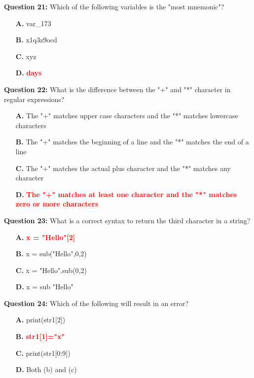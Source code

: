 \documentclass[12pt,a4paper]{article}
\begin{document}
\vspace{0.5cm}

\textbf{Question 21:} Which of the following variables is the "most mnemonic"?

\begin{itemize}
    \item[\textbf{A.}] var_173
    \item[\textbf{B.}] x1q3z9ocd
    \item[\textbf{C.}] xyz
    \item[\textbf{D.}] \textcolor{red}{\textbf{days}}
\end{itemize}

\vspace{0.5cm}

\textbf{Question 22:} What is the difference between the "+" and "*" character in regular expressions?

\begin{itemize}
    \item[\textbf{A.}] The "+" matches upper case characters and the "*" matches lowercase characters
    \item[\textbf{B.}] The "+" matches the beginning of a line and the "*" matches the end of a line
    \item[\textbf{C.}] The "+" matches the actual plus character and the "*" matches any character
    \item[\textbf{D.}] \textcolor{red}{\textbf{The "+" matches at least one character and the "*" matches zero or more characters}}
\end{itemize}

\vspace{0.5cm}

\textbf{Question 23:} What is a correct syntax to return the third character in a string?

\begin{itemize}
    \item[\textbf{A.}] \textcolor{red}{\textbf{x = "Hello"[2]}}
    \item[\textbf{B.}] x = sub("Hello",0,2)
    \item[\textbf{C.}] x = "Hello".sub(0,2)
    \item[\textbf{D.}] x = sub "Hello"
\end{itemize}

\vspace{0.5cm}

\textbf{Question 24:} Which of the following will result in an error?

\begin{itemize}
    \item[\textbf{A.}] print(str1[2])
    \item[\textbf{B.}] \textcolor{red}{\textbf{str1[1]="x"}}
    \item[\textbf{C.}] print(str1[0:9])
    \item[\textbf{D.}] Both (b) and (c)
\end{itemize}
\end{document}
